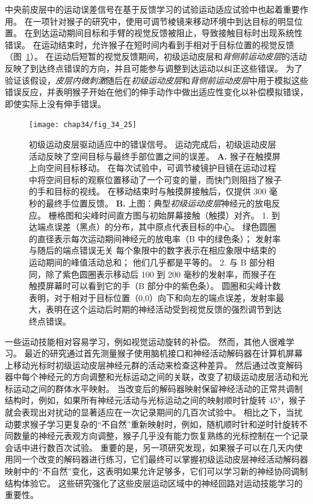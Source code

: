 中央前皮层中的运动误差信号在基于反馈学习的试验运动适应试验中也起着重要作用。
在一项针对猴子的研究中，使用可调节棱镜来移动环境中到达目标的明显位置。
在到达运动期间目标和手臂的视觉反馈被阻止，导致接触目标时出现系统性错误。
在运动结束时，允许猴子在短时间内看到手相对于目标位置的视觉反馈（图~\ref{fig:34_25}）。
在运动后短暂的视觉反馈期间，初级运动皮层和\textit{背侧前运动皮层}的活动反映了到达终点错误的方向，并且可能参与调整到达运动以纠正这些错误。
为了验证该假设，\textit{皮层内微刺激}随后在\textit{初级运动皮层}和\textit{背侧前运动皮层}中用于模拟这些错误反应，并表明猴子开始在他们的伸手动作中做出适应性变化以补偿模拟错误，即使实际上没有伸手错误。


\begin{figure}[htbp]
	\centering
	\texttt{[image: chap34/fig\_34\_25]}
	\caption{初级运动皮层驱动适应中的错误信号。
		运动完成后，初级运动皮层活动反映了空间目标与最终手部位置之间的误差\cite{inoue2016error}。
		\textbf{A.} 猴子在触摸屏上向空间目标移动。
		在每次试验中，可调节棱镜护目镜在运动过程中将空间目标的观察位置移动了一个可变的量，而快门则阻挡了猴子的手和目标的视线。
		在移动结束时与触摸屏接触后，仅提供 300 毫秒的最终手位置反馈。
		\textbf{B.} 上图：典型\textit{初级运动皮层}神经元的放电反应。
		栅格图和尖峰时间直方图与初始屏幕接触（触摸）对齐。
		1. 到达端点误差（黑点）的分布，其中原点代表目标的中心。
		绿色圆圈的直径表示每次运动期间神经元的放电率（B 中的绿色条）；
		发射率与随后的端点错误无关
		 每个象限中的数字表示在相应象限中结束的运动期间的峰值活动总和；
		 他们几乎都是平等的。
		 2. 与 B 部分相同，除了紫色圆圈表示移动后 100 到 200 毫秒的发射率，而猴子在触摸屏幕时可以看到它的手（B 部分中的紫色条）。
		 圆圈和尖峰计数表明，对于相对于目标位置（0,0）向下和向左的端点误差，发射率最大，表明在这个运动后时期的神经活动受到视觉反馈的强烈调节到达终点错误。}
	\label{fig:34_25}
\end{figure}


一些运动技能相对容易学习，例如视觉运动旋转的补偿。
然而，其他人很难学习。
最近的研究通过首先测量猴子使用脑机接口和神经活动解码器在计算机屏幕上移动光标时初级运动皮层神经元群的活动来检查这种差异。
然后通过改变解码器中每个神经元的方向调整和光标运动之间的关联，改变了初级运动皮层活动和光标运动之间的群体水平映射。
当改变后的解码器映射保留神经活动的正常共调制结构时，例如，如果所有神经元活动与光标运动之间的映射顺时针旋转 45°，猴子就会表现出对扰动的显著适应在一次记录期间的几百次试验中。
相比之下，当扰动要求猴子学习更复杂的“不自然”重新映射时，例如，随机顺时针和逆时针旋转不同数量的神经元表观方向调整，猴子几乎没有能力恢复熟练的光标控制在一个记录会话中进行数百次试验。
重要的是，另一项研究发现，如果猴子可以在几天内使用同一个改变的解码器进行练习，它们最终可以掌握初级运动皮层神经活动解码器映射中的“不自然”变化，这表明如果允许足够多，它们可以学习新的神经协同调制结构体验它。
这些研究强化了这些皮层运动区域中的神经回路对运动技能学习的重要性。


